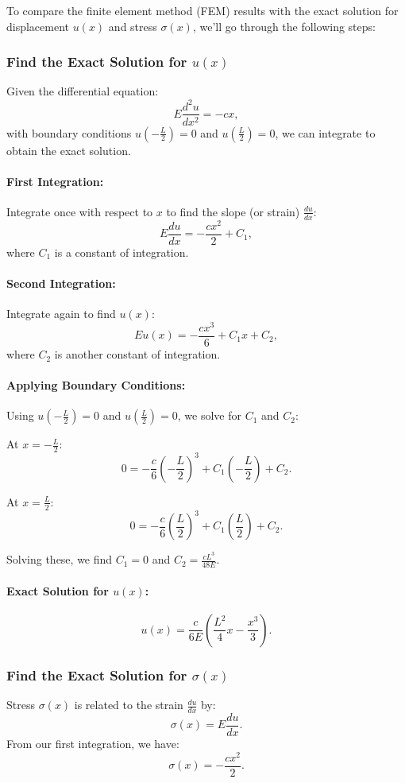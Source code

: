 \documentclass{article}
\begin{document}
To compare the finite element method (FEM) results with the exact solution for displacement \( u(x) \) and stress \( \sigma(x) \), we’ll go through the following steps:

\subsubsection*{Find the Exact Solution for \( u(x) \)}
Given the differential equation:
\[
E \frac{d^2 u}{dx^2} = -c x,
\]
with boundary conditions \( u\left(-\frac{L}{2}\right) = 0 \) and \( u\left(\frac{L}{2}\right) = 0 \), we can integrate to obtain the exact solution.

\paragraph{First Integration:} Integrate once with respect to \( x \) to find the slope (or strain) \( \frac{du}{dx} \):
\[
E \frac{du}{dx} = -\frac{c x^2}{2} + C_1,
\]
where \( C_1 \) is a constant of integration.

\paragraph{Second Integration:} Integrate again to find \( u(x) \):
\[
E u(x) = -\frac{c x^3}{6} + C_1 x + C_2,
\]
where \( C_2 \) is another constant of integration.

\paragraph{Applying Boundary Conditions:} Using \( u\left(-\frac{L}{2}\right) = 0 \) and \( u\left(\frac{L}{2}\right) = 0 \), we solve for \( C_1 \) and \( C_2 \):

At \( x = -\frac{L}{2} \):
\[
0 = -\frac{c}{6}\left(-\frac{L}{2}\right)^3 + C_1\left(-\frac{L}{2}\right) + C_2.
\]

At \( x = \frac{L}{2} \):
\[
0 = -\frac{c}{6}\left(\frac{L}{2}\right)^3 + C_1\left(\frac{L}{2}\right) + C_2.
\]

Solving these, we find \( C_1 = 0 \) and \( C_2 = \frac{c L^3}{48 E} \).

\paragraph{Exact Solution for \( u(x) \):}
\[
u(x) = \frac{c}{6 E} \left(\frac{L^2}{4} x - \frac{x^3}{3}\right).
\]

\subsubsection*{Find the Exact Solution for \( \sigma(x) \)}
Stress \( \sigma(x) \) is related to the strain \( \frac{du}{dx} \) by:
\[
\sigma(x) = E \frac{du}{dx}.
\]
From our first integration, we have:
\[
\sigma(x) = -\frac{c x^2}{2}.
\]
\end{document}
